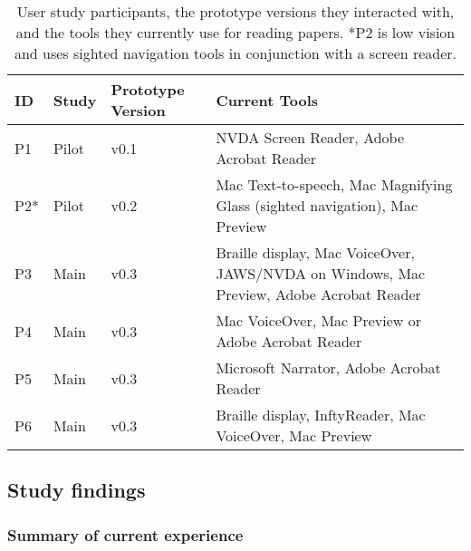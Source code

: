 \begin{table}[t!]
    \small
    \centering
    \begin{tabularx}{0.8\linewidth}{lllL{70mm}}
        \toprule
        \textbf{ID} & \textbf{Study} & \textbf{Prototype Version} & \textbf{Current Tools} \\
        \midrule
        P1 & Pilot & v0.1 & NVDA Screen Reader, Adobe Acrobat Reader \\
        \midrule
        P2* & Pilot & v0.2 & Mac Text-to-speech, Mac Magnifying Glass (sighted navigation), Mac Preview \\
        \midrule
        P3 & Main & v0.3 & Braille display, Mac VoiceOver, JAWS/NVDA on Windows, Mac Preview, Adobe Acrobat Reader \\
        \midrule
        P4 & Main & v0.3 & Mac VoiceOver, Mac Preview or Adobe Acrobat Reader \\
        \midrule
        P5 & Main & v0.3 & Microsoft Narrator, Adobe Acrobat Reader \\
        \midrule
        P6 & Main & v0.3 & Braille display, InftyReader, Mac VoiceOver, Mac Preview  \\
        \bottomrule
    \end{tabularx}
    \caption{User study participants, the prototype versions they interacted with, and the tools they currently use for reading papers. *P2 is low vision and uses sighted navigation tools in conjunction with a screen reader.
    }
    \label{tab:user_summary}
\end{table}

\subsection{Study findings}

\subsubsection*{Summary of current experience} 

